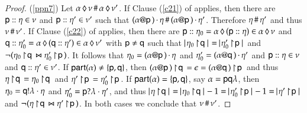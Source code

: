 \begin{proof}
(\ref{ppn7}) Let ${\alpha}\,\lozenge\,{\nu}\,\#\,{\alpha}\,\lozenge\,{\nu'}$. If Clause
(\ref{c21}) of  applies, then there are
${\sf p}:: \eta\in \nu$ and ${\sf p}:: \eta'\in
\nu'$ such that
$(\alpha @ {\sf p}\,)\,{\cdot}\,\eta\,\#\,(\alpha @ {\sf p}\,)\,{\cdot}\,\eta'$.
Therefore $\eta \,\#\, \eta'$ and thus $\nu \,\#\, \nu'$.  If
Clause (\ref{c22}) of  applies, then there
are
${\sf p}:: \eta_0={\alpha}\,\lozenge\,{({\sf p}:: \eta)}\in{\alpha}\,\lozenge\,{\nu}
$ and
${\sf q}:: \eta'_0={\alpha}\,\lozenge\,{({\sf q}:: \eta')}\in{\alpha}\,\lozenge\,{\nu'}$
with ${\sf p} \neq {\sf q}$ such that $\cardin{\proj{\procev_0}\q} =
\cardin{\proj{\procev'_0}\pp}$ and
$\neg(\eta_0 \! \upharpoonright \! {\sf q}\,\Join \eta'_0 \! \upharpoonright \! {\sf p}\,)$.  It follows
that $\eta_0 =(\alpha @ {\sf p}\,)\,{\cdot}\,\eta$ and $\eta'_0
=(\alpha @ {\sf q}\,)\,{\cdot}\,\eta'$ and ${\sf p}:: \eta\in
\nu$ and ${\sf q}:: \eta'\in \nu'$.  If
${\sf part}(\alpha)\neq\{{\sf p},{\sf q}\}$, then
$(\alpha @ {\sf p}\,) \! \upharpoonright \! {\sf q}\, = \epsilon =
(\alpha @ {\sf q}\,) \! \upharpoonright \! {\sf p}\,$ and thus
$\eta \! \upharpoonright \! {\sf q}\,=\eta_0 \! \upharpoonright \! {\sf q}\,$ and
$\eta' \! \upharpoonright \! {\sf p}\,=\eta'_0 \! \upharpoonright \! {\sf p}\,$.  If
${\sf part}(\alpha)=\{{\sf p},{\sf q}\}$, say $\alpha={\sf p}{\sf q}\lambda$, then
$\eta_0={\sf q}!\lambda\cdot\eta$ and
$\eta'_0={\sf p}?\lambda\cdot\eta'$, and thus
$\cardin{\proj{\procev}\q} = \cardin{\proj{\procev_0}\q} - 1 =
\cardin{\proj{\procev'_0}\pp} -1 = \cardin{\proj{\procev'}\pp}$ and
$\neg(\eta \! \upharpoonright \! {\sf q}\,\Join \eta' \! \upharpoonright \! {\sf p}\,)$. In both cases
we conclude that $\nu \,\#\, \nu'$.
\end{proof}


